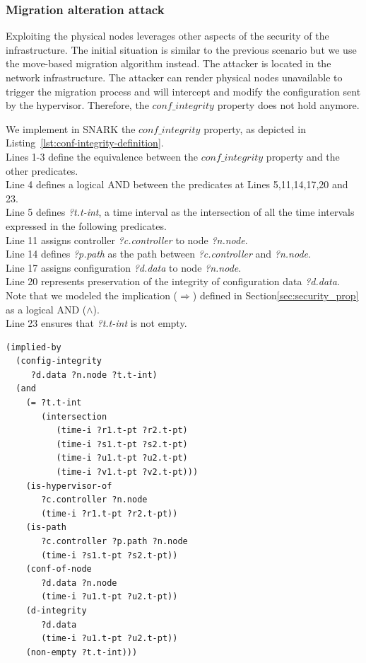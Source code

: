 \subsubsection{Migration alteration attack}
Exploiting the physical nodes leverages other aspects of the security of the infrastructure.
The initial situation is similar to the previous scenario but we use the move-based migration algorithm instead.
The attacker is located in the network infrastructure.
The attacker can render physical nodes unavailable to trigger the migration process and will intercept and modify the configuration sent by the hypervisor. 
Therefore, the $conf\_integrity$ property does not hold anymore.

We implement in SNARK the $conf\_integrity$ property, as depicted in Listing~\ref{lst:conf-integrity-definition}.\\
Lines 1-3 define the equivalence between the $conf\_integrity$ property and the other predicates.\\
Line 4 defines a logical AND between the predicates at Lines 5,11,14,17,20 and 23.\\
Line 5 defines \textit{?t.t-int}, a time interval as the intersection of all the time intervals expressed in the following predicates.\\
Line 11 assigns controller \textit{?c.controller} to node \textit{?n.node}.\\
Line 14 defines \textit{?p.path} as the path between \textit{?c.controller} and \textit{?n.node}.\\
Line 17 assigns configuration \textit{?d.data} to node \textit{?n.node}.\\
Line 20 represents preservation of the integrity of configuration data \textit{?d.data}.\\
Note that we modeled the implication ($\Rightarrow$) defined in Section\ref{sec:security_prop} as a logical AND (\ie $\wedge$).\\
Line 23 ensures that \textit{?t.t-int} is not empty.

\begin{lstlisting}[caption=SNARK definition of the configuration integrity., label=lst:conf-integrity-definition,captionpos=b] 
(implied-by
  (config-integrity 
     ?d.data ?n.node ?t.t-int)
  (and
    (= ?t.t-int
       (intersection
    	  (time-i ?r1.t-pt ?r2.t-pt)
    	  (time-i ?s1.t-pt ?s2.t-pt)
    	  (time-i ?u1.t-pt ?u2.t-pt)
    	  (time-i ?v1.t-pt ?v2.t-pt)))
    (is-hypervisor-of
       ?c.controller ?n.node 
       (time-i ?r1.t-pt ?r2.t-pt))
    (is-path 
	   ?c.controller ?p.path ?n.node
       (time-i ?s1.t-pt ?s2.t-pt))
    (conf-of-node
	   ?d.data ?n.node
       (time-i ?u1.t-pt ?u2.t-pt))
    (d-integrity
	   ?d.data
       (time-i ?u1.t-pt ?u2.t-pt))
    (non-empty ?t.t-int)))

\end{lstlisting}

